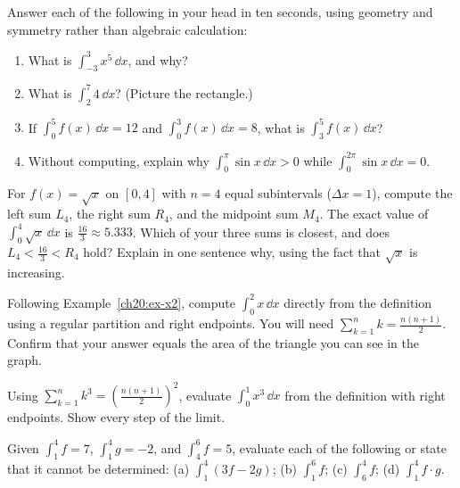 \begin{exercise}
Answer each of the following in your head in ten seconds, using geometry and symmetry rather than algebraic calculation:
\begin{enumerate}[label=\textbf{(\alph*)}]
\item What is $\int_{-3}^3 x^5\,\dd x$, and why?
\item What is $\int_2^7 4\,\dd x$? (Picture the rectangle.)
\item If $\int_0^5 f(x)\,\dd x = 12$ and $\int_0^3 f(x)\,\dd x = 8$, what is $\int_3^5 f(x)\,\dd x$?
\item Without computing, explain why $\int_0^{\pi} \sin x\,\dd x > 0$ while $\int_0^{2\pi} \sin x\,\dd x = 0$.
\end{enumerate}
\end{exercise}

\begin{exercise}
For $f(x) = \sqrt{x}$ on $[0,4]$ with $n=4$ equal subintervals
($\Delta x = 1$), compute the left sum $L_4$, the right sum $R_4$, and the
midpoint sum $M_4$. The exact value of $\int_0^4 \sqrt{x}\,\dd x$ is
$\tfrac{16}{3}\approx 5.333$. Which of your three sums is closest, and does
$L_4 < \tfrac{16}{3} < R_4$ hold? Explain in one sentence why, using the fact
that $\sqrt{x}$ is increasing.
\end{exercise}

\begin{exercise}
Following Example~\ref{ch20:ex-x2}, compute $\int_0^2 x\,\dd x$ directly from the
definition using a regular partition and right endpoints. You will need
$\sum_{k=1}^n k = \tfrac{n(n+1)}{2}$. Confirm that your answer equals the area of
the triangle you can see in the graph.
\end{exercise}

\begin{exercise}
Using $\sum_{k=1}^n k^3 = \left(\tfrac{n(n+1)}{2}\right)^2$, evaluate
$\int_0^1 x^3\,\dd x$ from the definition with right endpoints. Show every step
of the limit.
\end{exercise}

\begin{exercise}
Given $\int_1^4 f = 7$, $\int_1^4 g = -2$, and $\int_4^6 f = 5$, evaluate each of
the following or state that it cannot be determined:
(a) $\int_1^4 (3f - 2g)$;\quad
(b) $\int_1^6 f$;\quad
(c) $\int_6^4 f$;\quad
(d) $\int_1^4 f\cdot g$.
\end{exercise}

